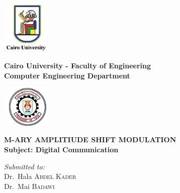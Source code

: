 \documentclass[a4paper,12pt]{report}
\begin{document}
\begin{titlepage}
    \begin{center}
        \begin{minipage}{2.5cm}
        \begin{center}
            \includegraphics[width=2.3cm,height=2.5cm]{slogan.jpg}
        \end{center}
    \end{minipage}\hfill
    \begin{minipage}{10cm}
        \begin{center}
      {\bfseries\large Cairo University - Faculty of Engineering}\\[0.1cm]
      {\bfseries\large Computer Engineering Department}\\[0.1cm]
      \end{center}
    
    \end{minipage}\hfill
    \begin{minipage}{2.5cm}
        \begin{center}
            \includegraphics[width=2.5cm,height=2cm]{logo_cufe.png}
        \end{center}
    
    \end{minipage}
    
    \vspace{5cm}
    
    {\Huge \bfseries \uppercase{M-ary Amplitiude Shift Modulation} \\[0.5cm] }
    {\LARGE \bfseries Subject: Digital Communication}
    \textsc{\Large }\\[1cm]
    
    \vspace{5cm}
    
    \begin{minipage}{15cm}
      \begin{flushleft} \huge
        \emph{Submitted to:}\\
        Dr.~Hala \textsc{Abdel Kader}\\
        Dr.~Mai \textsc{Badawi}\\
      \end{flushleft}
    \end{minipage}
    

\end{center}
\end{titlepage}
\end{document}
